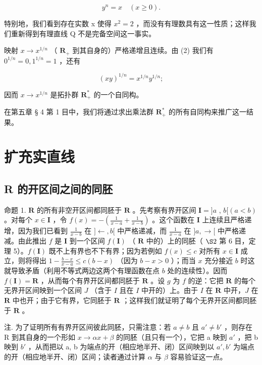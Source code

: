 \[
y ^ {n} = x \quad (x \geqslant 0).\tag{2}
\]

特别地，我们看到存在实数 x 使得 \(x^{2}=2\) ，而没有有理数具有这一性质；这样我们重新得到有理直线 Q 不是完备空间这一事实。

映射 \(x \to x^{1/n}\) （ \(\mathbf{R}_+\) 到其自身的）严格递增且连续。由 (2) 我们有 \(0^{1/n}=0, 1^{1/n}=1\) ，还有

\[
(x y) ^ {1 / n} = x ^ {1 / n} y ^ {1 / n};\tag{3}
\]

因而 \(x \to x^{1/n}\) 是拓扑群 \(\mathbf{R}_{+}^{*}\) 的一个自同构。

在第五章 § 4 第 1 目中，我们将通过求出乘法群 \(\mathbf{R}_{+}^{*}\) 的所有自同构来推广这一结果。

\section{扩充实直线}

\subsection{R 的开区间之间的同胚}

命题 1. \(\mathbf{R}\) 的所有非空开区间都同胚于 \(\mathbf{R}\) 。先考察有界开区间 \(\mathbf{I} = ]a\) , \(b[(a < b)\) 。对每个 \(x \in \mathbf{I}\) ，令 \(f(x) = -\left(\frac{1}{x - a} + \frac{1}{x - b}\right)\) 。这个函数在 \(\mathbf{I}\) 上连续且严格递增，因为我们已看到 \(\frac{1}{x - b}\) 在 \(]\leftarrow, b[\) 中严格递减，而 \(\frac{1}{x - a}\) 在 \(]a, \rightarrow[\) 中严格递减。由此推出 \(f\) 是 \(\mathbf{I}\) 到一个区间 \(f(\mathbf{I})\) （ \(\mathbf{R}\) 中的）上的同胚（ \(\S 2\) 第 6 目，定理 5）。\(f(\mathbf{I})\) 既不上有界也不下有界；因为若例如 \(f(x) \leqslant c\) 对所有 \(x \in \mathbf{I}\) 成立，则将得出 \(1 - \frac{b - x}{x - a} \leqslant c(b - x)\) （因为 \(b - x > 0\) ）；而当 \(x\) 充分接近 \(b\) 时这就导致矛盾（利用不等式两边这两个有理函数在点 \(b\) 处的连续性）。因而 \(f(\mathbf{I}) = \mathbf{R}\) ，从而每个有界开区间都同胚于 \(\mathbf{R}\) 。设 \(g\) 为 \(f\) 的逆：它把 \(\mathbf{R}\) 的每个无界开区间映到一个区间 \(J\) （含于 \(I\) 且在 \(I\) 中开的）上。由于 \(I\) 在 \(\mathbf{R}\) 中开，\(J\) 在 \(\mathbf{R}\) 中也开；由于它有界，它同胚于 \(\mathbf{R}\) ；这样我们就证明了每个无界开区间都同胚于 \(\mathbf{R}\) 。

注. 为了证明所有有界开区间彼此同胚，只需注意：若 \(a \neq b\) 且 \(a' \neq b'\) ，则存在 R 到其自身的一个形如 \(x \to \alpha x + \beta\) 的同胚（且只有一个），它把 a 映到 \(a'\) ，把 b 映到 \(b'\) ，从而把以 a, b 为端点的开（相应地半开、闭）区间映到以 \(a', b'\) 为端点的开（相应地半开、闭）区间；读者通过计算 \(\alpha\) 与 \(\beta\) 容易验证这一点。

